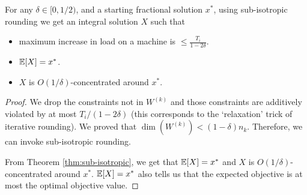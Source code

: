 
\begin{theorem}
For any $\delta \in [0,1/2)$, and a starting fractional solution $x^*$,
using sub-isotropic rounding we get an integral solution $X$ such that
\begin{itemize}
    \item maximum increase in load on a machine is $\leq \frac{T_i}{1-2\delta}$.
    \item $\operatorname{\mathbb{E}}[X] = x^*$.
    \item $X$ is $O(1/\delta)$-concentrated around $x^*$.
\end{itemize}
\end{theorem}
\begin{proof}
We drop the constraints not in $W^{(k)}$ and those constraints are
additively violated by at most $T_i/(1-2\delta)$
(this corresponds to the `relaxation' trick of iterative rounding).
We proved that $\dim(W^{(k)}) < (1-\delta)n_k$. Therefore, we can invoke sub-isotropic rounding.

From Theorem \ref{thm:sub-isotropic}, we get that $\operatorname{\mathbb{E}}[X] = x^*$ and $X$ is $O(1/\delta)$-concentrated around $x^*$.
$\operatorname{\mathbb{E}}[X] = x^*$ also tells us that the expected objective is at most the optimal objective value.
\end{proof}
